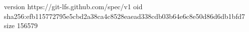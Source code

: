 version https://git-lfs.github.com/spec/v1
oid sha256:efb115772795e5cbd2a38ca4c8528eaead338cdb03b64e6c8e50d86d6db1bfd7
size 156579
